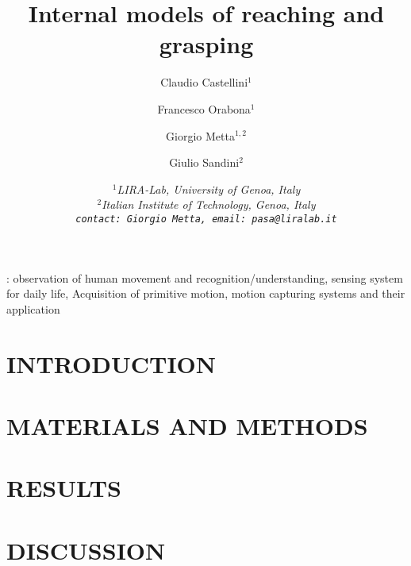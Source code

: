\documentclass{arsubmit}
\title{Internal models of reaching and grasping}
\author{Claudio Castellini$^1$ \and Francesco Orabona$^1$ \and Giorgio Metta$^{1,2}$ \and Giulio Sandini$^2$}
\date{\small \it{
$^1$LIRA-Lab, University of Genoa, Italy\\
$^2$Italian Institute of Technology, Genoa, Italy\\
{\tt contact: Giorgio Metta, email: pasa@liralab.it}
}}
\begin{document}
\maketitle

\begin{abstract}

\end{abstract}

\vspace{1cm}
: observation of human movement and
recognition/understanding, sensing system for daily life, Acquisition
of primitive motion, motion capturing systems and their application

\section{INTRODUCTION}
\label{sec:introduction}


\section{MATERIALS AND METHODS}
\label{sec:exp_desc}


\section{RESULTS}
\label{sec:exp_res}


\section{DISCUSSION}
\label{sec:Conclusions}


{\small


}
\end{document}
